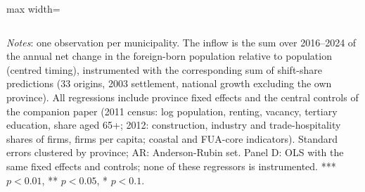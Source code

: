 \begin{table}[!htbp]
\begin{adjustbox}{max width=\linewidth}
\begin{tabular}{lccccc}
\bottomrule\end{tabular}\end{adjustbox}
\begin{minipage}{0.97\linewidth}\footnotesize\vspace{4pt}
\textit{Notes}: one observation per municipality. The inflow is the sum over 2016--2024 of the annual net change in the foreign-born population relative to population (centred timing), instrumented with the corresponding sum of shift-share predictions (33 origins, 2003 settlement, national growth excluding the own province). All regressions include province fixed effects and the central controls of the companion paper (2011 census: log population, renting, vacancy, tertiary education, share aged 65+; 2012: construction, industry and trade-hospitality shares of firms, firms per capita; coastal and FUA-core indicators). Standard errors clustered by province; AR: Anderson-Rubin set. Panel D: OLS with the same fixed effects and controls; none of these regressors is instrumented. *** $p<0.01$, ** $p<0.05$, * $p<0.1$.
\end{minipage}\end{table}